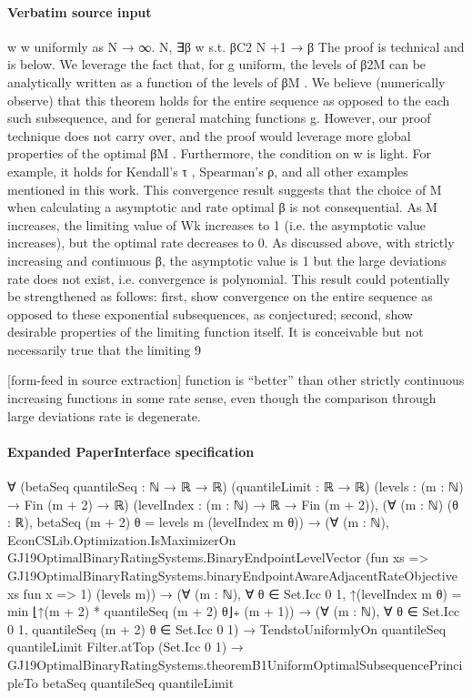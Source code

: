 \documentclass[10pt]{article}
\begin{document}
\paragraph{Verbatim source input}
\begin{ReviewVerbatim}
w
w uniformly as N → ∞.
N, ∃β w s.t. βC2
N +1 → β
The proof is technical and is below. We leverage the fact that, for g uniform, the levels of β2M
can be analytically written as a function of the levels of βM . We believe (numerically observe)
that this theorem holds for the entire sequence as opposed to the each such subsequence, and for
general matching functions g. However, our proof technique does not carry over, and the proof
would leverage more global properties of the optimal βM .
Furthermore, the condition on w is light. For example, it holds for Kendall’s τ , Spearman’s ρ,
and all other examples mentioned in this work.
This convergence result suggests that the choice of M when calculating a asymptotic and rate
optimal β is not consequential. As M increases, the limiting value of Wk increases to 1 (i.e. the
asymptotic value increases), but the optimal rate decreases to 0. As discussed above, with strictly
increasing and continuous β, the asymptotic value is 1 but the large deviations rate does not exist,
i.e. convergence is polynomial.
This result could potentially be strengthened as follows: first, show convergence on the entire
sequence as opposed to these exponential subsequences, as conjectured; second, show desirable
properties of the limiting function itself. It is conceivable but not necessarily true that the limiting
9


[form-feed in source extraction]
function is “better” than other strictly continuous increasing functions in some rate sense, even
though the comparison through large deviations rate is degenerate.
\end{ReviewVerbatim}


\paragraph{Expanded PaperInterface specification}
\begin{ReviewVerbatim}
∀ (betaSeq quantileSeq : ℕ → ℝ → ℝ) (quantileLimit : ℝ → ℝ) (levels : (m : ℕ) → Fin (m + 2) → ℝ)
  (levelIndex : (m : ℕ) → ℝ → Fin (m + 2)),
  (∀ (m : ℕ) (θ : ℝ), betaSeq (m + 2) θ = levels m (levelIndex m θ)) →
    (∀ (m : ℕ),
        EconCSLib.Optimization.IsMaximizerOn GJ19OptimalBinaryRatingSystems.BinaryEndpointLevelVector
          (fun xs => GJ19OptimalBinaryRatingSystems.binaryEndpointAwareAdjacentRateObjective xs fun x => 1)
          (levels m)) →
      (∀ (m : ℕ), ∀ θ ∈ Set.Icc 0 1, ↑(levelIndex m θ) = min ⌊↑(m + 2) * quantileSeq (m + 2) θ⌋₊ (m + 1)) →
        (∀ (m : ℕ), ∀ θ ∈ Set.Icc 0 1, quantileSeq (m + 2) θ ∈ Set.Icc 0 1) →
          TendstoUniformlyOn quantileSeq quantileLimit Filter.atTop (Set.Icc 0 1) →
            GJ19OptimalBinaryRatingSystems.theoremB1UniformOptimalSubsequencePrincipleTo betaSeq quantileSeq
              quantileLimit
\end{ReviewVerbatim}
\end{document}
